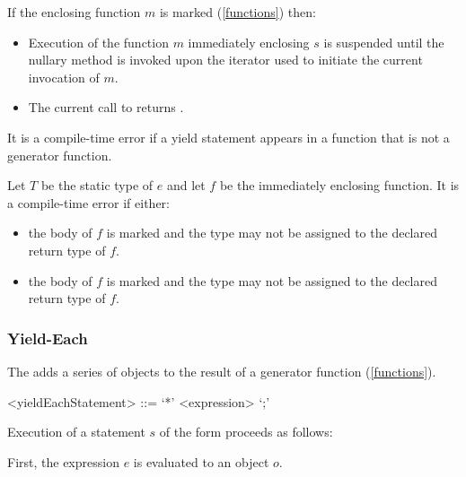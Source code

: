 \documentclass[makeidx]{article}
\begin{document}
{\LMHash{}%
If the enclosing function $m$ is marked \code{\SYNC*} (\ref{functions}) then:
\begin{itemize}
\item
Execution of the function $m$ immediately enclosing $s$ is suspended until the nullary method  is invoked upon the iterator used to initiate the current invocation of $m$.
\item
The current call to  returns \TRUE.
\end{itemize}

\LMHash{}%
It is a compile-time error if a yield statement appears in a function that is not a generator function.

\LMHash{}%
Let $T$ be the static type of $e$ and let $f$ be the immediately enclosing function.
It is a compile-time error if either:
\begin{itemize}
\item
the body of $f$ is marked \code{\ASYNC*} and the type  may not be assigned to the declared return type of $f$.
\item
the body of $f$ is marked \code{\SYNC*} and the type  may not be assigned to the declared return type of $f$.
\end{itemize}


\subsubsection{Yield-Each}

\LMHash{}%
The  adds a series of objects
to the result of a generator function
(\ref{functions}).

\begin{grammar}
<yieldEachStatement> ::= \YIELD{} `*' <expression> `;'
\end{grammar}

\LMHash{}%
Execution of a statement $s$ of the form  proceeds as follows:

\LMHash{}%
First, the expression $e$ is evaluated to an object $o$.

}
\end{document}
